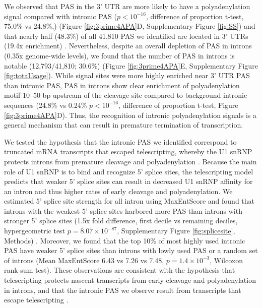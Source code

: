  We observed that PAS in the 3' UTR are more likely to have a polyadenylation signal compared with intronic PAS ($p < 10^{-16}$, difference of proportion t-test, 75.0\% vs 24.8\%,) (Figure \ref{fig:3prime4APA}D, Supplementary Figure \ref{fig:SS}) and that nearly half (48.3\%) of all 41,810 PAS we identified are located in 3' UTRs (19.4x enrichment) \citep{singh_widespread_2018}. Nevertheless, despite an overall depletion of PAS in introns (0.35x genome-wide levels), we found that the number of PAS in introns is notable (12,793/41,810; 30.6\%) (Figure \ref{fig:3prime4APA}E, Supplementary Figure \ref{fig:totaUsage}).  While signal sites were more highly enriched near 3' UTR PAS than intronic PAS, PAS in introns show clear enrichment of polyadenylation motif 10--50 bp upstream of the cleavage site compared to background intronic sequences (24.8\% vs 0.24\% $p < 10^{-16}$, difference of proportion t-test, Figure \ref{fig:3prime4APA}D).  Thus, the recognition of intronic polyadenylation signals is a general mechanism that can result in premature termination of transcription. 
 
 We  tested the hypothesis that the intronic PAS we identified correspond to truncated mRNA transcripts that escaped telescripting, whereby the U1 snRNP protects introns from premature cleavage and polyadenylation \citep{kaida_u1_2010, berg_u1_2012, oh_u1_2017}. Because the main role of U1 snRNP is to bind and recognize 5' splice sites, the telescripting model predicts that weaker 5' splice sites can result in decreased U1 snRNP affinity for an intron and thus higher rates of early cleavage and polyadenylation. We estimated 5' splice site strength for all intron using MaxEntScore \citep{yeo_maximum_2004} and found that introns with the weakest 5' splice sites harbored more PAS than introns with stronger 5' splice sites (1.5x fold difference, first decile vs remaining deciles, hypergeometric test $p = 8.07\times10^{-87}$, Supplementary Figure \ref{fig:splicesite}, Methods) \citep{tian_widespread_2007}. Moreover, we found that the top 10\% of most highly used intronic PAS have weaker 5' splice sites than introns with lowly used PAS or a random set of introns (Mean MaxEntScore 6.43 vs 7.26 vs 7.48, $p=1.4\times10^{-3}$, Wilcoxon rank sum test). These observations are consistent with the hypothesis that telescripting protects nascent transcripts from early cleavage and polyadenylation in introns, and that the intronic PAS we observe result from transcripts that escape telescripting \citep{kaida_u1_2010, berg_u1_2012, oh_u1_2017}.


